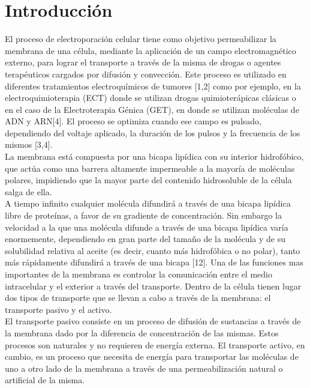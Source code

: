 \chapter{Introducción}


El proceso de electroporación celular tiene como objetivo permeabilizar la membrana de una célula, mediante la aplicación de un campo electromagnético externo, para lograr el transporte a través de la misma de drogas o agentes terapéuticos cargados por difusión y convección. Este proceso es utilizado en diferentes tratamientos electroquímicos de tumores [1,2] como por ejemplo, en la electroquimioterapia (ECT) donde se utilizan drogas quimioterápicas clásicas o en el caso de la Electroterapia Génica (GET), en donde se utilizan moléculas de ADN y ARN[4]. El proceso se optimiza cuando ese campo es pulsado, dependiendo del voltaje aplicado, la duración de los pulsos y la frecuencia de los mismos [3,4].\\

La membrana está compuesta por una bicapa lipídica con su interior hidrofóbico, que actúa como una barrera altamente impermeable a la mayoría de moléculas polares, impidiendo que la mayor parte del contenido hidrosoluble de la célula salga de ella. \\

A tiempo infinito  cualquier molécula difundirá a través de una bicapa lipídica libre de proteínas, a favor de su gradiente de concentración. Sin embargo la velocidad a la que una molécula difunde a través de una bicapa lipídica varía enormemente, dependiendo en gran parte del tamaño de la molécula y de su solubilidad relativa al aceite (es decir, cuanto más hidrofóbica o no polar), tanto más rápidamente difundirá a través de una bicapa [12]. Una de las funciones mas importantes de la membrana es controlar la comunicación entre el medio intracelular y el exterior a través del transporte. Dentro de la célula tienen lugar dos tipos de transporte que se llevan a cabo a través de la membrana: el transporte pasivo y el activo. \\

El transporte pasivo consiste en un proceso de difusión de sustancias a través de la membrana dado por la diferencia de concentración de las mismas. Estos procesos son naturales y no requieren de energía externa. El transporte activo, en cambio, es un proceso que necesita de energía para transportar las moléculas de uno a otro lado de la membrana a través de una permeabilización natural o artificial de la misma.\\

